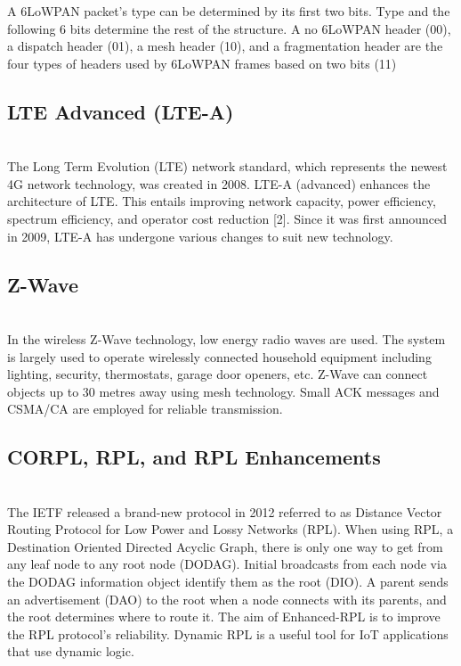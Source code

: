 \documentclass{article}
\begin{document}
A 6LoWPAN packet's type can be determined by its first two bits. Type and the following 6 bits determine the rest of the structure. A no 6LoWPAN header (00), a dispatch header (01), a mesh header (10), and a fragmentation header are the four types of headers used by 6LoWPAN frames based on two bits (11)
\\
\subsection{LTE Advanced (LTE-A)}
\\
The Long Term Evolution (LTE) network standard, which represents the newest 4G network technology, was created in 2008. LTE-A (advanced) enhances the architecture of LTE. This entails improving network capacity, power efficiency, spectrum efficiency, and operator cost reduction [2]. Since it was first announced in 2009, LTE-A has undergone various changes to suit new technology.
\\
\subsection{Z-Wave}
\\
In the wireless Z-Wave technology, low energy radio waves are used. The system is largely used to operate wirelessly connected household equipment including lighting, security, thermostats, garage door openers, etc. Z-Wave can connect objects up to 30 metres away using mesh technology. Small ACK messages and CSMA/CA are employed for reliable transmission.
\\
\subsection{CORPL, RPL, and RPL Enhancements}
\\
The IETF released a brand-new protocol in 2012  referred to as Distance Vector Routing Protocol for Low Power and Lossy Networks (RPL). When using RPL, a Destination Oriented Directed Acyclic Graph, there is only one way to get from any leaf node to any root node (DODAG). Initial broadcasts from each node via the DODAG information object identify them as the root (DIO). A parent sends an advertisement (DAO) to the root when a node connects with its parents, and the root determines where to route it. The aim of Enhanced-RPL is to improve the RPL protocol's reliability. Dynamic RPL is a useful tool for IoT applications that use dynamic logic.
\\
\end{document}
